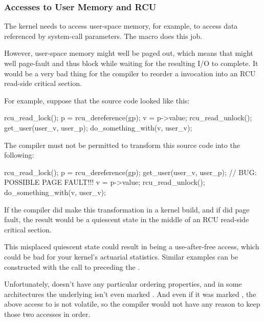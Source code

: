 \subsubsection{Accesses to User Memory and RCU}

The kernel needs to access user-space memory, for example, to access data
referenced by system-call parameters.
The  macro does this job.

However, user-space memory might well be paged out, which means that
 might well page-fault and thus block while waiting for the
resulting I/O to complete.
It would be a very bad thing for the compiler to
reorder a  invocation into an RCU read-side critical section.

For example, suppose that the source code looked like this:

\begin{VerbatimN}
	rcu_read_lock();
	p = rcu_dereference(gp);
	v = p->value;
	rcu_read_unlock();
	get_user(user_v, user_p);
	do_something_with(v, user_v);
\end{VerbatimN}

The compiler must not be permitted to transform this source code into
the following:

\begin{fcvlabel}
\begin{VerbatimN}[commandchars=\%\@\$]
	rcu_read_lock();
	p = rcu_dereference(gp);
	get_user(user_v, user_p); // BUG: POSSIBLE PAGE FAULT!!!
	v = p->value;     %
	rcu_read_unlock();
	do_something_with(v, user_v);
\end{VerbatimN}
\end{fcvlabel}

If the compiler did make this transformation in a  kernel
build, and if  did page fault, the result would be a quiescent
state in the middle of an RCU read-side critical section.
\begin{fcvref}
This misplaced
quiescent state could result in  %
being a use-after-free access,
which could be bad for your kernel's actuarial statistics.
Similar examples
can be constructed with the call to  preceding the
.
\end{fcvref}

Unfortunately,  doesn't have any particular ordering properties,
and in some architectures the underlying  isn't even marked
.
And even if it was marked , the above access to
 is not volatile, so the compiler would not have any reason to keep
those two accesses in order.


